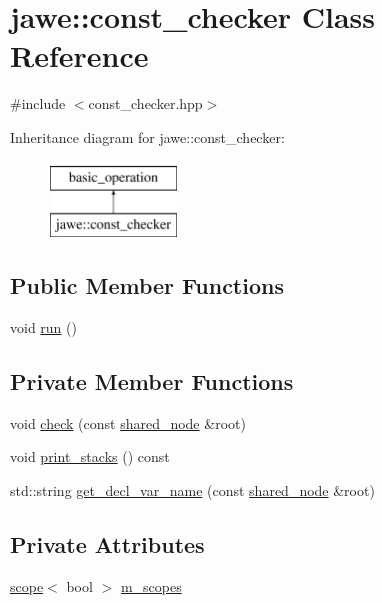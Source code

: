 \hypertarget{classjawe_1_1const__checker}{}\section{jawe\+:\+:const\+\_\+checker Class Reference}
\label{classjawe_1_1const__checker}


{\ttfamily \#include $<$const\+\_\+checker.\+hpp$>$}

Inheritance diagram for jawe\+:\+:const\+\_\+checker\+:\begin{figure}[H]
\begin{center}
\leavevmode
\includegraphics[height=2.000000cm]{classjawe_1_1const__checker}
\end{center}
\end{figure}
\subsection*{Public Member Functions}
\begin{DoxyCompactItemize}
\item 
void \hyperlink{classjawe_1_1const__checker_aa0c7604001ebd8aae5ddab7b52271b47}{run} ()
\end{DoxyCompactItemize}
\subsection*{Private Member Functions}
\begin{DoxyCompactItemize}
\item 
void \hyperlink{classjawe_1_1const__checker_a24bb1b4bee084d3ccd7f8310b6ffed97}{check} (const \hyperlink{namespacejawe_a3f307481d921b6cbb50cc8511fc2b544}{shared\+\_\+node} \&root)
\item 
void \hyperlink{classjawe_1_1const__checker_a4f114db74deafd147266b7677889788e}{print\+\_\+stacks} () const
\item 
std\+::string \hyperlink{classjawe_1_1const__checker_ada31fcc80da323dad6a80d25438c6bdc}{get\+\_\+decl\+\_\+var\+\_\+name} (const \hyperlink{namespacejawe_a3f307481d921b6cbb50cc8511fc2b544}{shared\+\_\+node} \&root)
\end{DoxyCompactItemize}
\subsection*{Private Attributes}
\begin{DoxyCompactItemize}
\item 
\hyperlink{classjawe_1_1utils_1_1scope}{scope}$<$ bool $>$ \hyperlink{classjawe_1_1const__checker_a61092ccd1994ec0075ca03ec39ea4477}{m\+\_\+scopes}
\end{DoxyCompactItemize}


